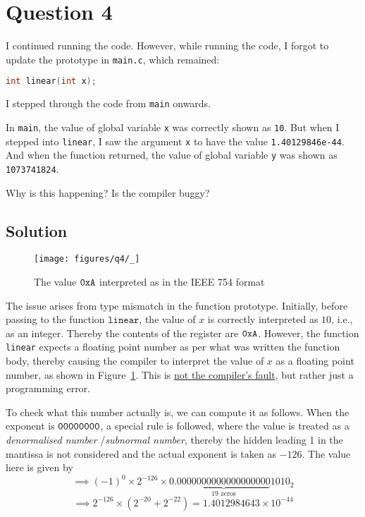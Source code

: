 \section*{Question 4}

I continued running the code.
However, while running the code, I forgot to update the prototype in \texttt{main.c}, which remained:
\begin{lstlisting}[language=C]
int linear(int x);
\end{lstlisting}

I stepped through the code from \texttt{main} onwards.

In \texttt{main}, the value of global variable \texttt{x} was correctly shown as \texttt{10}.
But when I stepped into \texttt{linear}, I saw the argument \texttt{x} to have the value \texttt{1.40129846e-44}.
And when the function returned, the value of global variable \texttt{y} was shown as \texttt{1073741824}.

Why is this happening?
Is the compiler buggy?

\subsection*{Solution}

\begin{figure*}[htbp]
    \centering
    \texttt{[image: figures/q4/\_]}
    \setlength{\abovecaptionskip}{-12pt}
    \caption{
        The value \( \texttt{0xA} \) interpreted as in the IEEE 754 format
    }\label{fig:q4}
\end{figure*}

The issue arises from type mismatch in the function prototype.
Initially, before passing to the function \( \texttt{linear} \), the value of \( x \) is correctly interpreted as \( 10 \), i.e., as an integer.
Thereby the contents of the register are \( \texttt{0xA} \).
However, the function \texttt{linear} expects a floating point number as per what was written the function body, thereby causing the compiler to interpret the value of \( x \) as a floating point number, as shown in Figure~\ref{fig:q4}.
This is \underline{not the compiler's fault}, but rather just a programming error.

To check what this number actually is, we can compute it as follows.
When the exponent is \( \texttt{00000000} \), a special rule is followed, where the value is treated as a \textit{denormalised number} /\textit{subnormal number}, thereby the hidden leading 1 in the mantissa is not considered and the actual exponent is taken as \( -126 \).
The value here is given by
\[
    \implies
    {(-1)}^0 \times 2^{ -126 } \times 0.\underbrace{0000000000000000000}_{19\text{ zeros}}1010_{2}
\]
\begin{equation*}
    \implies
    2^{ - 126 } \times (2^{-20} + 2^{-22})
    =
    \boxed{
        1.4012984643 \times 10^{-44}
    }
\end{equation*}

